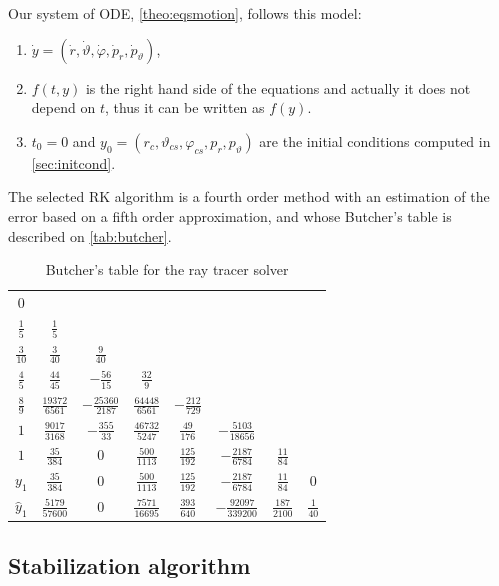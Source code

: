 Our system of \ac{ODE}, \autoref{theo:eqsmotion}, follows this model:
\begin{enumerate}
	\item $\dot{y} = (\dot{r}, \dot{\vartheta}, \dot{\varphi}, \dot{p}_r, \dot{p}_\vartheta)$,
	\item $f(t,y)$ is the right hand side of the equations and actually it does not depend on $t$, thus it can be written as $f(y)$.
	\item $t_0 = 0$ and $y_0 = (r_c, \vartheta_{cs}, \varphi_{cs}, p_{r}, p_{\vartheta})$ are the initial conditions computed in \autoref{sec:initcond}.
\end{enumerate}

The selected \ac{RK} algorithm is a fourth order method with an estimation of the error based on a fifth order approximation, and whose Butcher's table is described on \autoref{tab:butcher}.

\begin{table}[bth]
	\myfloatalign
	\begin{tabularx}{.9\textwidth}{c|ccccccc}
		$0$&  & & & & & & \\
		$\frac{1}{5}$&  $\frac{1}{5}$& & & & & & \\
		$\frac{3}{10}$&  $\frac{3}{40}$&  $\frac{9}{40}$& & & & & \\
		$\frac{4}{5}$&  $\frac{44}{45}$&  $-\frac{56}{15}$&  $\frac{32}{9}$& & & & \\
		$\frac{8}{9}$&  $\frac{19372}{6561}$&  $-\frac{25360}{2187}$&  $\frac{64448}{6561}$&  $-\frac{212}{729}$& & & \\
		$1$&  $\frac{9017}{3168}$&  $-\frac{355}{33}$&  $\frac{46732}{5247}$&  $\frac{49}{176}$&  $-\frac{5103}{18656}$& & \\
		$1$&  $\frac{35}{384}$&  $0$&  $\frac{500}{1113}$&  $\frac{125}{192}$&  $-\frac{2187}{6784}$&  $\frac{11}{84}$& \\ \hline
		$y_1$&  $\frac{35}{384}$&  $0$&  $\frac{500}{1113}$&  $\frac{125}{192}$&  $-\frac{2187}{6784}$&  $\frac{11}{84}$&  $0$ \\ \hline
		$\widehat{y}_1$&  $\frac{5179}{57600}$&  $0$&  $\frac{7571}{16695}$&  $\frac{393}{640}$&  $-\frac{92097}{339200}$&  $\frac{187}{2100}$&  $\frac{1}{40}$
	\end{tabularx}
	\caption{Butcher's table for the ray tracer solver}
	\label{tab:butcher}
\end{table}

\subsection{Stabilization algorithm}

